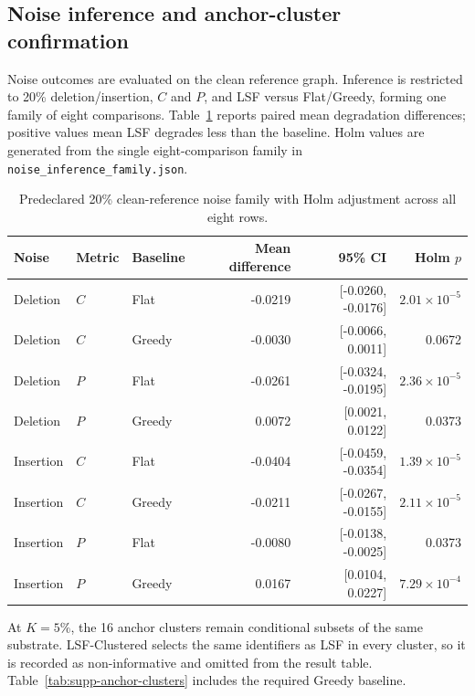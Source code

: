 \documentclass[pdflatex,sn-basic]{sn-jnl}
\begin{document}
\subsection{Noise inference and anchor-cluster confirmation}

Noise outcomes are evaluated on the clean reference graph. Inference is restricted to 20\% deletion/insertion, $C$ and $P$, and LSF versus Flat/Greedy, forming one family of eight comparisons. Table~\ref{tab:supp-noise-family} reports paired mean degradation differences; positive values mean LSF degrades less than the baseline. Holm values are generated from the single eight-comparison family in \texttt{noise\_inference\_family.json}.

\begin{table}[ht]
\caption{Predeclared 20\% clean-reference noise family with Holm adjustment across all eight rows.}
\label{tab:supp-noise-family}
\centering
\scriptsize
\begin{tabular}{@{}lllrrr@{}}
\toprule
Noise & Metric & Baseline & Mean difference & 95\% CI & Holm $p$ \\
\midrule
Deletion & $C$ & Flat & -0.0219 & [-0.0260, -0.0176] & $2.01\times10^{-5}$ \\
Deletion & $C$ & Greedy & -0.0030 & [-0.0066, 0.0011] & 0.0672 \\
Deletion & $P$ & Flat & -0.0261 & [-0.0324, -0.0195] & $2.36\times10^{-5}$ \\
Deletion & $P$ & Greedy & 0.0072 & [0.0021, 0.0122] & 0.0373 \\
Insertion & $C$ & Flat & -0.0404 & [-0.0459, -0.0354] & $1.39\times10^{-5}$ \\
Insertion & $C$ & Greedy & -0.0211 & [-0.0267, -0.0155] & $2.11\times10^{-5}$ \\
Insertion & $P$ & Flat & -0.0080 & [-0.0138, -0.0025] & 0.0373 \\
Insertion & $P$ & Greedy & 0.0167 & [0.0104, 0.0227] & $7.29\times10^{-4}$ \\
\bottomrule
\end{tabular}
\end{table}

At $K=5\%$, the 16 anchor clusters remain conditional subsets of the same substrate. LSF-Clustered selects the same identifiers as LSF in every cluster, so it is recorded as non-informative and omitted from the result table. Table~\ref{tab:supp-anchor-clusters} includes the required Greedy baseline.
\end{document}
